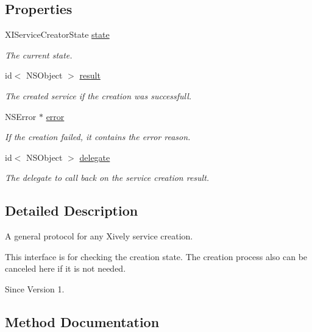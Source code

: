 \subsection*{Properties}
\begin{DoxyCompactItemize}
\item 
X\+I\+Service\+Creator\+State \hyperlink{protocol_x_i_service_creator_01-p_ab07d33a31807e2a14a192b2d0245b49d}{state}
\begin{DoxyCompactList}\small\item\em The current state. \end{DoxyCompactList}\item 
id$<$ N\+S\+Object $>$ \hyperlink{protocol_x_i_service_creator_01-p_a02cfe3158566e5cd227cd5113f17225c}{result}
\begin{DoxyCompactList}\small\item\em The created service if the creation was successfull. \end{DoxyCompactList}\item 
N\+S\+Error $\ast$ \hyperlink{protocol_x_i_service_creator_01-p_a972777a7cea43ed9f2a5dacf8361e73f}{error}
\begin{DoxyCompactList}\small\item\em If the creation failed, it contains the error reason. \end{DoxyCompactList}\item 
id$<$ N\+S\+Object $>$ \hyperlink{protocol_x_i_service_creator_01-p_a60e9b426925df3fb4ac7d74e23a28cbb}{delegate}
\begin{DoxyCompactList}\small\item\em The delegate to call back on the service creation result. \end{DoxyCompactList}\end{DoxyCompactItemize}


\subsection{Detailed Description}
A general protocol for any Xively service creation. 

This interface is for checking the creation state. The creation process also can be canceled here if it is not needed. \begin{DoxySince}{Since}
Version 1. 
\end{DoxySince}


\subsection{Method Documentation}
\hypertarget{protocol_x_i_service_creator_01-p_a0ec672223c33f574b85edd1c17576ac3}{}\label{protocol_x_i_service_creator_01-p_a0ec672223c33f574b85edd1c17576ac3} 
